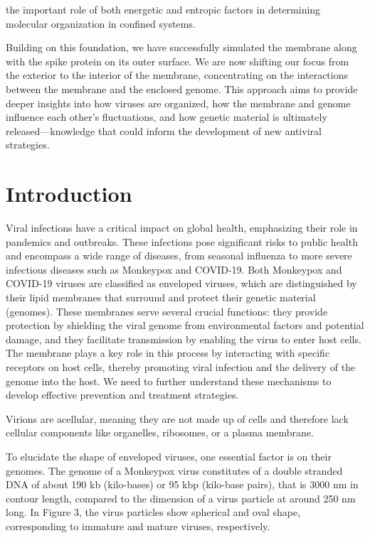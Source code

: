 \documentclass[12pt]{article}
\begin{document}
\begin{flushleft}
 \noindent  the important role of both energetic and entropic factors in determining molecular organization in confined systems.


Building on this foundation, we have successfully simulated the membrane along with the spike protein on its outer surface. We are now shifting our focus from the exterior to the interior of the membrane, concentrating on the interactions between the membrane and the enclosed genome. This approach aims to provide deeper insights into how viruses are organized, how the membrane and genome influence each other’s fluctuations, and how genetic material is ultimately released—knowledge that could inform the development of new antiviral strategies.



\vspace{-1em} 

\section*{Introduction}




Viral infections have a critical impact on global health, emphasizing their role in pandemics and outbreaks. These infections pose significant risks to public health and encompass a wide range of diseases, from seasonal influenza to more severe infectious diseases such as Monkeypox and COVID-19. Both Monkeypox and COVID-19 viruses are classified as enveloped viruses, which are distinguished by their lipid membranes that surround and protect their genetic material (genomes). These membranes serve several crucial functions: they provide protection by shielding the viral genome from environmental factors and potential damage, and they facilitate transmission by enabling the virus to enter host cells. The membrane plays a key role in this process by interacting with specific receptors on host cells, thereby promoting viral infection and the delivery of the genome into the host. We need to further understand these mechanisms to develop effective prevention and treatment strategies.




Virions are acellular, meaning they are not made up of cells and therefore lack cellular components like organelles, ribosomes, or a plasma membrane. 

To elucidate the shape of enveloped viruses, one essential factor is on their genomes. The genome of a Monkeypox virus constitutes of a double stranded DNA of about 190 kb (kilo-bases) or 95 kbp (kilo-base pairs), that is 3000 nm in contour length, compared to the dimension of a virus particle at around 250 nm long\cite{erez2019diagnosis}\cite{parker2007human}. In Figure 3, the virus particles show spherical and oval shape, corresponding to immature and mature viruses, respectively.


\end{flushleft}
\end{document}
